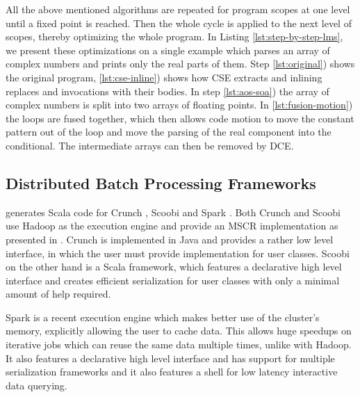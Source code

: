 All the above mentioned algorithms are repeated for program scopes at one level
until a fixed point is reached. Then the whole cycle is applied to the next
level of scopes, thereby optimizing the whole program. In Listing
\ref{lst:step-by-step-lms}, we present these optimizations on a single example
which parses an array of complex numbers and prints only the real parts of them.
Step \ref{lst:original}) shows the original program, \ref{lst:cse-inline}) shows
how CSE extracts  and inlining replaces  and 
invocations with their bodies. In step \ref{lst:aos-soa}) the array  of
complex numbers is split into two arrays of floating points.
In \ref{lst:fusion-motion}) the loops are fused together, which then allows code
motion to move the constant pattern out of the loop and move the parsing of the
real component into the conditional. The intermediate arrays can then be removed
by DCE.

\subsection{Distributed Batch Processing Frameworks}
\label{subsed:big-data-frameworks}
\tool generates Scala code for Crunch \cite{crunch}, Scoobi \cite{scoobi} and Spark \cite{spark-nsdi}. Both Crunch and Scoobi use Hadoop as the execution engine and provide an MSCR implementation as presented in \cite{chambers_flumejava:_2010}. Crunch is implemented in Java and provides a rather low level interface, in which the user must provide implementation for user classes. Scoobi on the other hand is a Scala framework, which features a declarative high level interface and creates efficient serialization for user classes with only a minimal amount of help required. 

Spark is a recent execution engine which makes better use of the cluster's
memory, explicitly allowing the user to cache data. This allows huge speedups on
iterative jobs which can reuse the same data multiple times, unlike with Hadoop.
It also features a declarative high level interface and has support for multiple
serialization frameworks and it also features a shell for low latency
interactive data querying.
